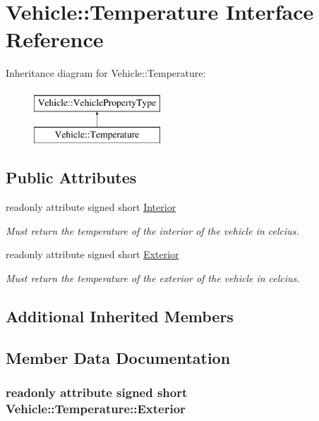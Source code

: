 \hypertarget{interfaceVehicle_1_1Temperature}{\section{Vehicle\-:\-:Temperature Interface Reference}
\label{interfaceVehicle_1_1Temperature}
}
Inheritance diagram for Vehicle\-:\-:Temperature\-:\begin{figure}[H]
\begin{center}
\leavevmode
\includegraphics[height=2.000000cm]{interfaceVehicle_1_1Temperature}
\end{center}
\end{figure}
\subsection*{Public Attributes}
\begin{DoxyCompactItemize}
\item 
readonly attribute signed short \hyperlink{interfaceVehicle_1_1Temperature_a67733e8d8744450e55018b9ad563d0c7}{Interior}
\begin{DoxyCompactList}\small\item\em Must return the temperature of the interior of the vehicle in celcius. \end{DoxyCompactList}\item 
readonly attribute signed short \hyperlink{interfaceVehicle_1_1Temperature_ab4d48f95e19f87b86a50a1172b70ee42}{Exterior}
\begin{DoxyCompactList}\small\item\em Must return the temperature of the exterior of the vehicle in celcius. \end{DoxyCompactList}\end{DoxyCompactItemize}
\subsection*{Additional Inherited Members}


\subsection{Member Data Documentation}
\hypertarget{interfaceVehicle_1_1Temperature_ab4d48f95e19f87b86a50a1172b70ee42}{
\subsubsection[{Exterior}]{\setlength{\rightskip}{0pt plus 5cm}readonly attribute signed short Vehicle\-::\-Temperature\-::\-Exterior}}\label{interfaceVehicle_1_1Temperature_ab4d48f95e19f87b86a50a1172b70ee42}


